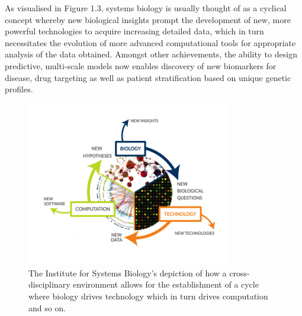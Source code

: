 As visualised in Figure 1.3, systems biology is usually thought of as a cyclical concept whereby new biological insights prompt the development of new, more powerful technologies to acquire increasing detailed data, which in turn necessitates the evolution of more advanced computational tools for appropriate analysis of the data obtained. Amongst other achievements, the ability to design predictive, multi-scale models now enables discovery of new biomarkers for disease, drug targeting as well as patient stratification based on unique genetic profiles.

\begin{figure}[H] 
    \centering
   \includegraphics[width=0.8\textwidth]{Figures/Chapter1/systems_bio.jpg}
\caption{\small{The Institute for Systems Biology's depiction of how a cross-disciplinary environment allows for the establishment of a cycle where biology drives technology which in turn drives computation and so on.} }
    \label{fig:3}
\end{figure}

